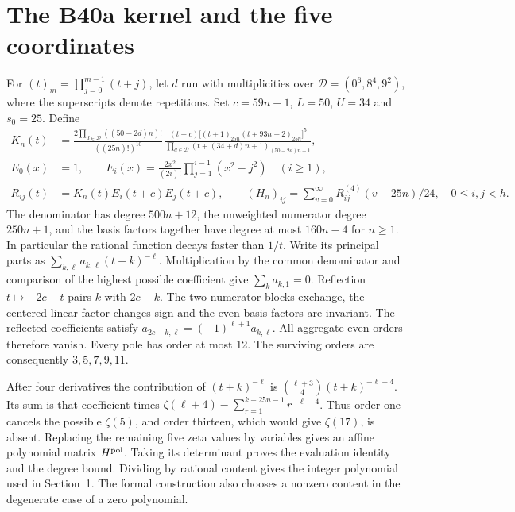 \documentclass[11pt]{article}
\begin{document}
\section{The B40a kernel and the five coordinates}
For $(t)_m=\prod_{j=0}^{m-1}(t+j)$, let $d$ run with multiplicities
over $\mathcal D=(0^6,8^4,9^2)$, where the superscripts denote repetitions.
Set $c=59n+1$, $L=50$, $U=34$ and $s_0=25$. Define
\begin{align*}
 K_n(t)&=\frac{2\prod_{d\in\mathcal D}((50-2d)n)!}{((25n)!)^{10}}\,
 \frac{(t+c)\big[(t+1)_{25n}(t+93n+2)_{25n}\big]^5}
 {\prod_{d\in\mathcal D}(t+(34+d)n+1)_{(50-2d)n+1}},\\
 E_0(x)&=1,\qquad E_i(x)=\frac{2x^2}{(2i)!}
                    \prod_{j=1}^{i-1}(x^2-j^2)\quad(i\ge1),\\
 R_{ij}(t)&=K_n(t)E_i(t+c)E_j(t+c),\qquad
 (H_n)_{ij}=\sum_{v=0}^{\infty} R_{ij}^{(4)}(v-25n)/24,\quad 0\le i,j<h .
\end{align*}
The denominator has degree $500n+12$, the unweighted numerator degree
$250n+1$, and the basis factors together have degree at most $160n-4$ for
$n\ge1$. In particular the rational function decays faster than $1/t$.
Write its principal parts as $\sum_{k,\ell} a_{k,\ell}(t+k)^{-\ell}$.
Multiplication by the common denominator and comparison of the highest
possible coefficient give $\sum_k a_{k,1}=0$. Reflection
$t\mapsto-2c-t$ pairs $k$ with $2c-k$. The two numerator blocks exchange,
the centered linear factor changes sign and the even basis factors are
invariant. The reflected coefficients satisfy
$a_{2c-k,\ell}=(-1)^{\ell+1}a_{k,\ell}$. All aggregate even orders
therefore vanish. Every pole has order at most 12. The surviving orders
are consequently $3,5,7,9,11$.

After four derivatives the contribution of $(t+k)^{-\ell}$ is
$\binom{\ell+3}{4}(t+k)^{-\ell-4}$. Its sum is that coefficient times
$\zeta(\ell+4)-\sum_{r=1}^{k-25n-1}r^{-\ell-4}$.
Thus order one cancels the possible $\zeta(5)$, and order thirteen,
which would give $\zeta(17)$, is absent. Replacing the remaining five
zeta values by variables gives an affine polynomial matrix $H^{\rm pol}$.
Taking its determinant proves the evaluation identity and the degree
bound. Dividing by rational content gives the integer polynomial used
in Section~1. The formal construction also chooses a nonzero content
in the degenerate case of a zero polynomial.
\end{document}
